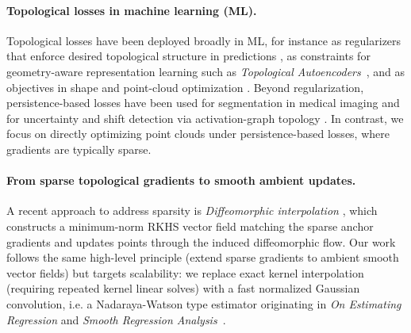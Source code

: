 \documentclass{article} %
\theoremstyle{plain}
\theoremstyle{definition}
\theoremstyle{remark}
\begin{document}
\paragraph{Topological losses in machine learning (ML).}
Topological losses have been deployed broadly in ML, for instance as regularizers that enforce desired topological structure in predictions \citep{pmlr-v89-chen19g,clough2020topoloss}, as constraints for geometry-aware representation learning such as \emph{Topological Autoencoders}~\cite{moor2020topoae}, and as objectives in shape and point-cloud optimization \citep{carriere2021optimizing}. Beyond regularization, persistence-based losses have been used for segmentation in medical imaging \citep{clough2020topoloss} and for uncertainty and shift detection via activation-graph topology \citep{lacombe2021}. In contrast, we focus on directly optimizing point clouds under persistence-based losses, where gradients are typically sparse.




\paragraph{From sparse topological gradients to smooth ambient updates.}
A recent approach to address sparsity is \emph{Diffeomorphic interpolation} \citep{carriere2024diffeomorphic}, which constructs a minimum-norm RKHS vector field matching the sparse anchor gradients and updates points through the induced diffeomorphic flow. Our work follows the same high-level principle (extend sparse gradients to ambient smooth vector fields) but targets scalability: we replace exact kernel interpolation (requiring repeated kernel linear solves) with a fast normalized Gaussian convolution, i.e. a Nadaraya-Watson type estimator originating in \emph{On Estimating Regression} \citep{nadaraya1964regression} and \emph{Smooth Regression Analysis}~\citep{watson1964smooth}.
\end{document}

